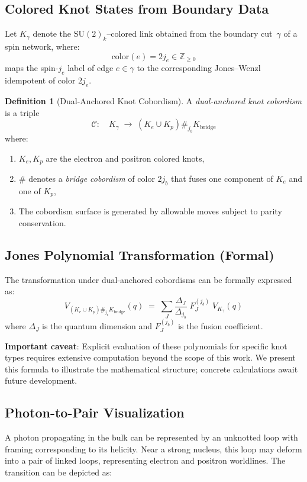 \documentclass[11pt]{article}
\theoremstyle{plain}
\theoremstyle{definition}
\newtheorem{definition}[theorem]{Definition}
\begin{document}
\subsection{Colored Knot States from Boundary Data}
Let $K_\gamma$ denote the $\mathrm{SU}(2)_k$--colored link obtained from the boundary cut~$\gamma$ of a spin network, where:
\[
  \mathrm{color}(e) = 2 j_e \in \mathbb{Z}_{\geq 0}
\]
maps the spin-$j_e$ label of edge $e \in \gamma$ to the corresponding Jones--Wenzl idempotent of color $2j_e$.

\begin{definition}[Dual-Anchored Knot Cobordism]
  A \emph{dual-anchored knot cobordism} is a triple
  \[
    \mathcal{C}:\quad K_\gamma \;\longrightarrow\; (K_e \cup K_p) \#_{j_b} K_{\mathrm{bridge}}
  \]
  where:
  \begin{enumerate}
    \item $K_e, K_p$ are the electron and positron colored knots,
    \item $\#$ denotes a \emph{bridge cobordism} of color $2j_b$ that fuses one component of $K_e$ and one of $K_p$,
    \item The cobordism surface is generated by allowable moves subject to parity conservation.
  \end{enumerate}
\end{definition}

\subsection{Jones Polynomial Transformation (Formal)}
The transformation under dual-anchored cobordisms can be formally expressed as:
\begin{equation}
  V_{(K_e \cup K_p) \#_{j_b} K_{\mathrm{bridge}}}(q)
  \;=\;
  \sum_{J}
  \frac{\Delta_J}{\Delta_{j_b}} \;
  F^{(j_b)}_{J} \;
  V_{K_\gamma}(q)
\end{equation}
where $\Delta_J$ is the quantum dimension and $F^{(j_b)}_J$ is the fusion coefficient.

\textbf{Important caveat}: Explicit evaluation of these polynomials for specific knot types requires extensive computation beyond the scope of this work. We present this formula to illustrate the mathematical structure; concrete calculations await future development.

\subsection{Photon-to-Pair Visualization}
A photon propagating in the bulk can be represented by an unknotted loop with framing corresponding to its helicity. Near a strong nucleus, this loop may deform into a pair of linked loops, representing electron and positron worldlines. The transition can be depicted as:
\end{document}
